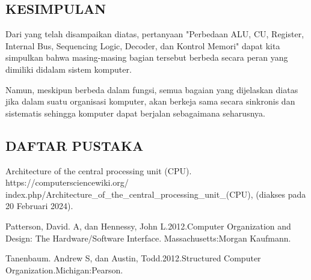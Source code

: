 \documentclass[12pt,a4paper]{article}
\begin{document}
    \begin{center}
    \subsection*{KESIMPULAN}
    \end{center}

    Dari yang telah disampaikan diatas, pertanyaan "Perbedaan ALU, CU, Register, Internal Bus,
    Sequencing Logic, Decoder, dan Kontrol Memori" dapat kita simpulkan bahwa
    masing-masing bagian tersebut berbeda secara peran yang dimiliki didalam
    sistem komputer.

    Namun, meskipun berbeda dalam fungsi, semua bagaian yang dijelaskan diatas
    jika dalam suatu organisasi komputer, akan berkeja sama secara sinkronis
    dan sistematis sehingga komputer dapat berjalan sebagaimana seharusnya.

    \begin{center}
      \subsection*{DAFTAR PUSTAKA}
    \end{center}

      Architecture of the central processing unit (CPU). https://computersciencewiki.org/
  index.php/Architecture\_of\_the\_central\_processing\_unit\_(CPU), (diakses pada 20 Februari 2024).

      Patterson, David. A, dan Hennessy, John L.2012.Computer Organization and Design: The Hardware/Software Interface. Massachusetts:Morgan Kaufmann.

      Tanenbaum. Andrew S, dan Austin, Todd.2012.Structured Computer Organization.Michigan:Pearson.
\end{document}
